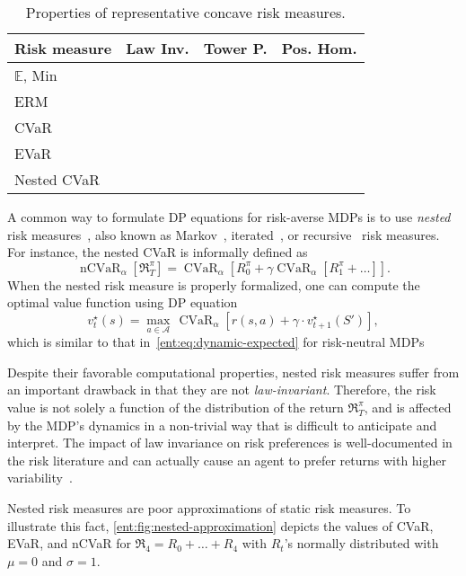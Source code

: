 \documentclass[twoside]{article}
\newcommand{\cmark}{\ding{51}}%
\newcommand{\xmark}{\ding{55}}%
\newcommand{\actions}{\mathcal{A}}
\newcommand{\opt}{^\star}
\newcommand{\cvar}[2]{\operatorname{CVaR}_{#1} \left[#2\right]}
\theoremstyle{plain}
\theoremstyle{definition}
\theoremstyle{remark}
\renewcommand{\cite}[1]{\citep{#1}}
\begin{document}
\begin{table}
  \caption{$\!$Properties of representative concave risk measures.}  \label{ent:tab:risk_measure_props}
  \centering
  \begin{tabular}{l|ccc}
    \toprule
    Risk measure & Law Inv. & Tower P. & Pos. Hom. \\
    \midrule
    $\mathbb{E}$, Min & \cmark & \cmark & \cmark \\
    ERM & \cmark & \cmark & \xmark \\
    CVaR & \cmark & \xmark & \cmark \\
    EVaR & \cmark & \xmark & \cmark \\
    Nested CVaR & \xmark & \cmark & \cmark \\
    \bottomrule
    \end{tabular}
\end{table}

A common way to formulate DP equations for risk-averse MDPs is to use  \emph{nested} risk measures~\cite{Shapiro2014}, also known as Markov~\cite{Ruszczynski2010}, iterated~\cite{Osogami2011}, or recursive~\cite{Bauerle2022} risk measures. For instance, the nested CVaR is informally defined as 
%
\begin{equation*}
\operatorname{nCVaR}_{\alpha}[\mathfrak{R}^{\pi}_T] = \cvar{\alpha}{ R_0^\pi + \gamma \cvar{\alpha}{R_1^{\pi} + \dots }}.
\end{equation*}
%
When the nested risk measure is properly formalized, one can compute the optimal value function using DP equation
%
\begin{equation*}
  v\opt_t(s)  =  \max_{a\in \actions}\,  \cvar{\alpha} {r(s,a) + \gamma \cdot  v_{t+1}\opt(S') },
\end{equation*}
%
which is similar to that in~\eqref{ent:eq:dynamic-expected} for risk-neutral MDPs

Despite their favorable computational properties, nested risk measures suffer from an important drawback in that they are not \emph{law-invariant}. Therefore, the risk value is not solely a function of the distribution of the return $\mathfrak{R}^{\pi}_T$, and is affected by the MDP's dynamics in a non-trivial way that is difficult to anticipate and interpret. The impact of law invariance on risk preferences is well-documented in the risk literature and can actually cause an agent to prefer returns with higher variability~\cite{Iancu2015}.

Nested risk measures are poor approximations of static risk measures. To illustrate this fact, \cref{ent:fig:nested-approximation} depicts the values of CVaR, EVaR, and nCVaR for $\mathfrak{R}_4 = R_0 + \dots  + R_4$ with $R_t$'s normally distributed with $\mu =0$ and $\sigma = 1$. 
\end{document}

